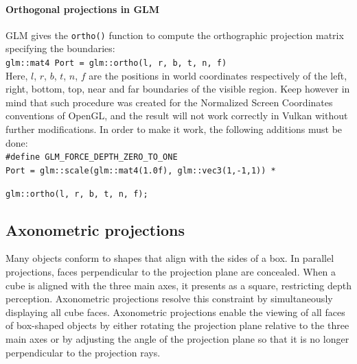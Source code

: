 \paragraph*{Orthogonal projections in GLM}
GLM gives the \texttt{ortho()} function to compute the orthographic projection matrix specifying the boundaries: \\
\texttt{glm::mat4 Port = glm::ortho(l, r, b, t, n, f)} \\
Here, $l$, $r$, $b$, $t$, $n$, $f$ are the positions in world coordinates respectively of the left, right, bottom, top, near and far boundaries of the visible region.
Keep however in mind that such procedure was created for the Normalized Screen Coordinates conventions of OpenGL, and the result will not work correctly in Vulkan without further modifications.
In order to make it work, the following additions must be done: \\
\texttt{\#define GLM\_FORCE\_DEPTH\_ZERO\_TO\_ONE} \\
\texttt{Port = glm::scale(glm::mat4(1.0f), glm::vec3(1,-1,1)) *} 

\qquad\:\texttt{glm::ortho(l, r, b, t, n, f);} 

\subsection{Axonometric projections}
Many objects conform to shapes that align with the sides of a box. 
In parallel projections, faces perpendicular to the projection plane are concealed. When a cube is aligned with the three main axes, it presents as a square, restricting depth perception. 
Axonometric projections resolve this constraint by simultaneously displaying all cube faces.
Axonometric projections enable the viewing of all faces of box-shaped objects by either rotating the projection plane relative to the three main axes or by adjusting the angle of the projection plane so that it is no longer perpendicular to the projection rays.

